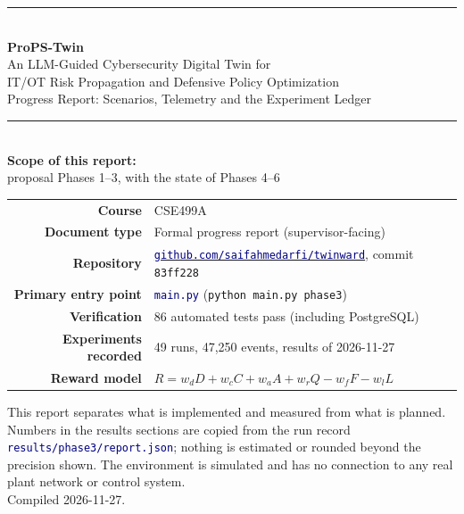\documentclass[11pt]{article}
\newcommand{\code}[1]{\texttt{\small #1}}
\newcommand{\file}[1]{\textcolor{navy}{\texttt{\small #1}}}
\begin{document}
\begin{titlepage}
\centering
\vspace*{1.5cm}
{\color{navy}\rule{\linewidth}{1.4pt}}\\[10pt]
{\Huge\bfseries ProPS-Twin}\\[8pt]
{\LARGE An LLM-Guided Cybersecurity Digital Twin for\\ IT/OT Risk Propagation
and Defensive Policy Optimization}\\[10pt]
{\large Progress Report: Scenarios, Telemetry and the Experiment Ledger}\\[6pt]
{\color{navy}\rule{\linewidth}{1.4pt}}\\[1.4cm]

{\large\textbf{Scope of this report:}\\ proposal Phases 1--3, with the state of
Phases 4--6}\\[1.2cm]

\begin{tabular}{rl}
\textbf{Course} & CSE499A\\[2pt]
\textbf{Document type} & Formal progress report (supervisor-facing)\\[2pt]
\textbf{Repository} & \href{https://github.com/saifahmedarfi/twinward}{\file{github.com/saifahmedarfi/twinward}}, commit \code{83ff228}\\[2pt]
\textbf{Primary entry point} & \file{main.py} (\code{python main.py phase3})\\[2pt]
\textbf{Verification} & 86 automated tests pass (including PostgreSQL)\\[2pt]
\textbf{Experiments recorded} & 49 runs, 47{,}250 events, results of 2026-11-27\\[2pt]
\textbf{Reward model} & $R=w_dD+w_cC+w_aA+w_rQ-w_fF-w_lL$\\
\end{tabular}

\vfill
{\small This report separates what is implemented and measured from what is
planned. Numbers in the results sections are copied from the run record
\file{results/phase3/report.json}; nothing is estimated or rounded beyond the
precision shown. The environment is simulated and has no connection to any real
plant network or control system.}\\[6pt]
{\small\color{gray}Compiled 2026-11-27.}
\end{titlepage}
\end{document}

